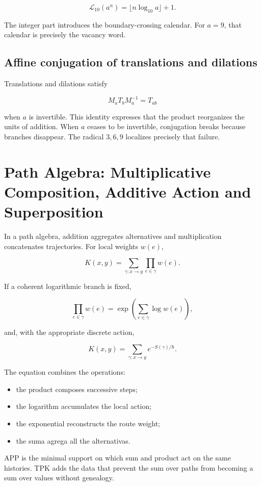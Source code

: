 \[
\mathcal L_{10}(a^n)
=\lfloor n\log_{10}a\rfloor+1.
\]

The integer part introduces the boundary-crossing calendar. For \(a=9\), that calendar is precisely the vacancy word.

\subsection{Affine conjugation of translations and dilations}

Translations and dilations satisfy

\[
M_aT_bM_a^{-1}=T_{ab}
\]

when \(a\) is invertible. This identity expresses that the product reorganizes the units of addition. When \(a\) ceases to be invertible, conjugation breaks because branches disappear. The radical \(3,6,9\) localizes precisely that failure.


\section{Path Algebra: Multiplicative Composition, Additive Action and Superposition}

In a path algebra, addition aggregates alternatives and multiplication concatenates trajectories. For local weights \(w(e)\),

\[
K(x,y)
=\sum_{\gamma:x\to y}
\prod_{e\in\gamma}w(e).
\]

If a coherent logarithmic branch is fixed,

\[
\prod_{e\in\gamma}w(e)
=\exp\!\left(\sum_{e\in\gamma}\log w(e)\right),
\]

and, with the appropriate discrete action,

\[
K(x,y)=\sum_{\gamma:x\to y}e^{-S(\gamma)/\hbar}.
\]

The equation combines the operations:

\begin{itemize}
\item the product composes successive steps;
\item the logarithm accumulates the local action;
\item the exponential reconstructs the route weight;
\item the suma agrega all the alternativas.
\end{itemize}

APP is the minimal support on which sum and product act on the same histories. TPK adds the data that prevent the sum over paths from becoming a sum over values without genealogy.

